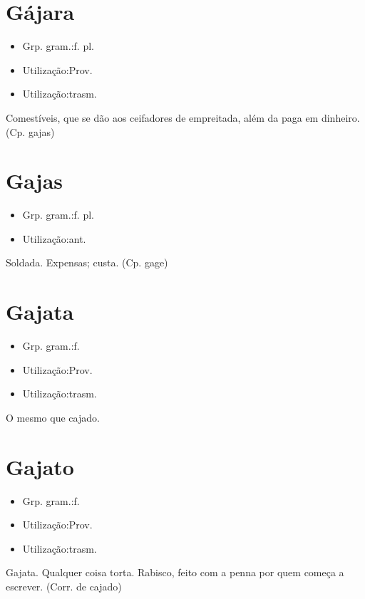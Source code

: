 \section{Gájara}
\begin{itemize}
\item {Grp. gram.:f. pl.}
\end{itemize}
\begin{itemize}
\item {Utilização:Prov.}
\end{itemize}
\begin{itemize}
\item {Utilização:trasm.}
\end{itemize}
Comestíveis, que se dão aos ceifadores de empreitada, além da paga em dinheiro.
(Cp. \textunderscore gajas\textunderscore )
\section{Gajas}
\begin{itemize}
\item {Grp. gram.:f. pl.}
\end{itemize}
\begin{itemize}
\item {Utilização:ant.}
\end{itemize}
Soldada.
Expensas; custa.
(Cp. \textunderscore gage\textunderscore )
\section{Gajata}
\begin{itemize}
\item {Grp. gram.:f.}
\end{itemize}
\begin{itemize}
\item {Utilização:Prov.}
\end{itemize}
\begin{itemize}
\item {Utilização:trasm.}
\end{itemize}
O mesmo que \textunderscore cajado\textunderscore .
\section{Gajato}
\begin{itemize}
\item {Grp. gram.:f.}
\end{itemize}
\begin{itemize}
\item {Utilização:Prov.}
\end{itemize}
\begin{itemize}
\item {Utilização:trasm.}
\end{itemize}
Gajata.
Qualquer coisa torta.
Rabisco, feito com a penna por quem começa a escrever.
(Corr. de \textunderscore cajado\textunderscore )

